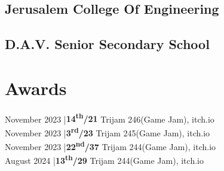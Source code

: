 \documentclass[]{deedy-resume-openfont}
\begin{document}
\begin{minipage}[t]{0.28\textwidth}
\subsection{Jerusalem College Of Engineering}
\sectionsep

\subsection{D.A.V. Senior Secondary School}
\sectionsep


\section{Awards}
November 2023 |{\bf 14\textsuperscript{th}/21} Trijam 246(Game Jam), itch.io\\
November 2023 |{\bf 3\textsuperscript{rd}/23}  Trijam 245(Game Jam), itch.io\\
November 2023 |{\bf 22\textsuperscript{nd}/37} Trijam 244(Game Jam), itch.io\\
August 2024        |{\bf 13\textsuperscript{th}/29} Trijam 244(Game Jam), itch.io\\
\sectionsep

%
%

\end{minipage} 
\hfill
\end{document}

